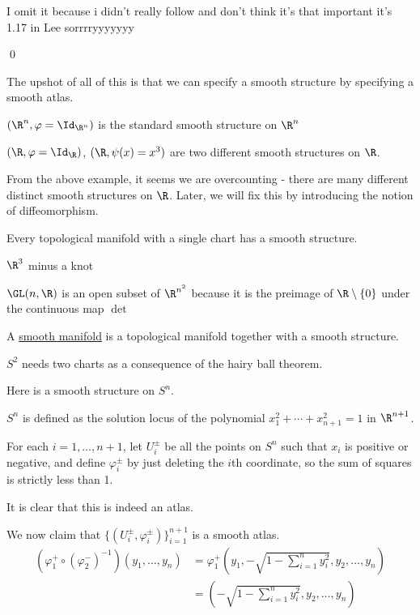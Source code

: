 \documentclass[x11names,reqno,14pt]{extarticle}
\renewcommand{\phi}{\varphi}
\begin{document}
\proof

I omit it because i didn't really follow and don't think it's that important it's 1.17 in Lee sorrrryyyyyyy

\qed

The upshot of all of this is that we can specify a smooth structure by specifying a smooth atlas. 

\exm

$(\R^n, \phi = \Id_{\R^n})$ is the standard smooth structure on $\R^n$

\exm

$(\R, \phi = \Id_\R)$, $(\R, \psi(x) = x^3)$ are two different smooth structures on $\R$. 

From the above example, it seems we are overcounting - there are many different distinct smooth structures on $\R$. Later, we will fix this by introducing the notion of diffeomorphism. 

Every topological manifold with a single chart has a smooth structure.

\exm

$\R^3$ minus a knot

\exm 

$\GL(n,\R)$ is an open subset of $\R^{n^2}$ because it is the preimage of $\R\setminus\{0\}$ under the continuous map $\det$


A \underline{smooth manifold} is a topological manifold together with a smooth structure. 

\exm $S^2$ needs two charts as a consequence of the hairy ball theorem. 

\exm

Here is a smooth structure on $S^n$. 

$S^n$ is defined as the solution locus of the polynomial $x_1^2 + \cdots + x_{n + 1}^2 = 1$ in $\R^{n + 1}$. 

For each $i = 1, \dots, n + 1$, let $U_i^{\pm}$ be all the points on $S^n$ such that $x_i$ is positive or negative, and define $\phi_i^\pm$ by just deleting the $i$th coordinate, so the sum of squares is strictly less than 1. 

It is clear that this is indeed an atlas. 

We now claim that $\{(U_i^\pm, \phi_i^\pm)\}_{i=1}^{n + 1}$ is a smooth atlas. 
\begin{align*}
(\phi_1^+\circ(\phi_2^-)^{-1})(y_1,\dots, y_n) & = \phi_1^+\left(y_1, -\sqrt{1 - \sum_{i=1}^ny_i^2}, y_2, \dots, y_n\right) \\
							& = \left(-\sqrt{1 - \sum_{i=1}^ny_i^2}, y_2, \dots, y_n\right)
\end{align*}
 
\end{document}
